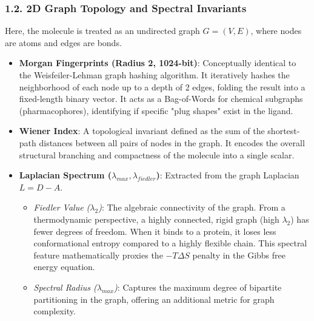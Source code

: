 \documentclass[11pt, a4paper]{article}
\begin{document}
\subsubsection*{1.2. 2D Graph Topology and Spectral Invariants}
Here, the molecule is treated as an undirected graph $G=(V,E)$, where nodes are atoms and edges are bonds.
\begin{itemize}[leftmargin=*]
    \item \textbf{Morgan Fingerprints (Radius 2, 1024-bit)}: Conceptually identical to the Weisfeiler-Lehman graph hashing algorithm. It iteratively
    hashes the neighborhood of each node up to a depth of 2 edges, folding the result into a fixed-length binary vector. It acts as a Bag-of-Words
    for chemical subgraphs (pharmacophores), identifying if specific "plug shapes" exist in the ligand.
    \item \textbf{Wiener Index}: A topological invariant defined as the sum of the shortest-path distances between all pairs of nodes in the graph.
    It encodes the overall structural branching and compactness of the molecule into a single scalar.
    \item \textbf{Laplacian Spectrum ($\lambda_{max}, \lambda_{fiedler}$)}: Extracted from the graph Laplacian $L = D - A$.
    \begin{itemize}
        \item \textit{Fiedler Value ($\lambda_2$)}: The algebraic connectivity of the graph. From a thermodynamic perspective, a highly connected,
        rigid graph (high $\lambda_2$) has fewer degrees of freedom. When it binds to a protein, it loses less conformational entropy compared
        to a highly flexible chain. This spectral feature mathematically proxies the $-T\Delta S$ penalty in the Gibbs free energy equation.
        \item \textit{Spectral Radius ($\lambda_{max}$)}: Captures the maximum degree of bipartite partitioning in the graph, offering an additional
        metric for graph complexity.
    \end{itemize}
\end{itemize}
\end{document}
